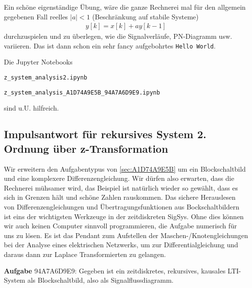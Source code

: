 \begin{Loesung}
Ein schöne eigenständige Übung, wäre die ganze Rechnerei mal für den allgemein
gegebenen Fall reelles $|a|<1$ (Beschränkung auf stabile Systeme)
\begin{align}
y[k] = x[k] + a y[k-1]
\end{align}
durchzuspielen und zu überlegen, wie die Signalverläufe, PN-Diagramm usw.
variieren. Das ist dann schon ein sehr fancy aufgebohrtes \texttt{Hello World}.

Die Jupyter Notebooks

\texttt{z\_system\_analysis2.ipynb}

\texttt{z\_system\_analysis\_A1D74A9E5B\_94A7A6D9E9.ipynb}

sind u.U. hilfreich.
\end{Loesung}


\newpage
\subsection{Impulsantwort für rekursives System 2. Ordnung über z-Transformation}
\label{sec:94A7A6D9E9}
\begin{Ziel}
Wir erweitern den Aufgabentypus von \ref{sec:A1D74A9E5B} um ein Blockschaltbild
und eine komplexere Differenzengleichung. Wir dürfen also erwarten, dass
die Rechnerei mühsamer wird, das Beispiel ist natürlich wieder so gewählt, dass
es sich in Grenzen hält und schöne Zahlen rauskommen. Das sichere Herauslesen
von Differenzengleichungen und Übertragungsfunktionen aus Bockschaltbildern
ist eins der wichtigsten Werkzeuge in der zeitdiskreten SigSys. Ohne dies
können wir auch keinen Computer sinnvoll programmieren, die Aufgabe numerisch
für uns zu lösen. Es ist das Pendant
zum Aufstellen der Maschen-/Knotengleichungen bei der Analyse eines elektrischen
Netzwerks, um zur Differentialgleichung und daraus dann zur Laplace Transformierten
zu gelangen.
\end{Ziel}
\textbf{Aufgabe} {\tiny 94A7A6D9E9}: Gegeben ist ein zeitdiskretes, rekursives,
kausales LTI-System als Blockschaltbild, also als Signalflussdiagramm.
